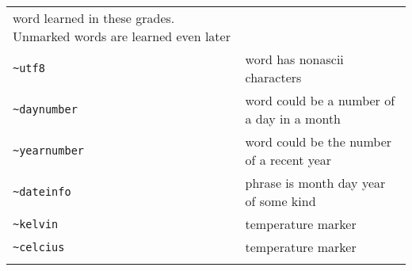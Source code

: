 \documentclass[]{article}
\begin{document}
\begin{longtable}[]{@{}ll@{}}
\begin{minipage}[t]{0.10\columnwidth}
word learned in these grades. Unmarked words are learned even
later\strut
\end{minipage}\tabularnewline
\begin{minipage}[t]{0.22\columnwidth}\raggedright\strut
\texttt{\textasciitilde{}utf8}\strut
\end{minipage} & \begin{minipage}[t]{0.10\columnwidth}\raggedright\strut
word has nonascii characters\strut
\end{minipage}\tabularnewline
\begin{minipage}[t]{0.22\columnwidth}\raggedright\strut
\texttt{\textasciitilde{}daynumber}\strut
\end{minipage} & \begin{minipage}[t]{0.10\columnwidth}\raggedright\strut
word could be a number of a day in a month\strut
\end{minipage}\tabularnewline
\begin{minipage}[t]{0.22\columnwidth}\raggedright\strut
\texttt{\textasciitilde{}yearnumber}\strut
\end{minipage} & \begin{minipage}[t]{0.10\columnwidth}\raggedright\strut
word could be the number of a recent year\strut
\end{minipage}\tabularnewline
\begin{minipage}[t]{0.22\columnwidth}\raggedright\strut
\texttt{\textasciitilde{}dateinfo}\strut
\end{minipage} & \begin{minipage}[t]{0.10\columnwidth}\raggedright\strut
phrase is month day year of some kind\strut
\end{minipage}\tabularnewline
\begin{minipage}[t]{0.22\columnwidth}\raggedright\strut
\texttt{\textasciitilde{}kelvin}\strut
\end{minipage} & \begin{minipage}[t]{0.10\columnwidth}\raggedright\strut
temperature marker\strut
\end{minipage}\tabularnewline
\begin{minipage}[t]{0.22\columnwidth}\raggedright\strut
\texttt{\textasciitilde{}celcius}\strut
\end{minipage} & \begin{minipage}[t]{0.10\columnwidth}\raggedright\strut
temperature marker\strut
\end{minipage}\tabularnewline
\begin{minipage}[t]{0.22\columnwidth}\raggedright\strut

\end{minipage}
\end{longtable}
\end{document}
